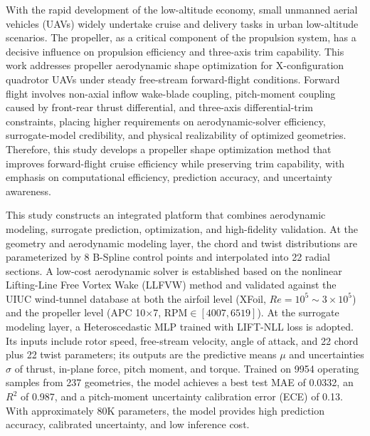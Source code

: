 \begin{eabstract}

With the rapid development of the low-altitude economy, small unmanned aerial vehicles (UAVs) widely undertake cruise and delivery tasks in urban low-altitude scenarios. The propeller, as a critical component of the propulsion system, has a decisive influence on propulsion efficiency and three-axis trim capability. This work addresses propeller aerodynamic shape optimization for X-configuration quadrotor UAVs under steady free-stream forward-flight conditions. Forward flight involves non-axial inflow wake-blade coupling, pitch-moment coupling caused by front-rear thrust differential, and three-axis differential-trim constraints, placing higher requirements on aerodynamic-solver efficiency, surrogate-model credibility, and physical realizability of optimized geometries. Therefore, this study develops a propeller shape optimization method that improves forward-flight cruise efficiency while preserving trim capability, with emphasis on computational efficiency, prediction accuracy, and uncertainty awareness.

This study constructs an integrated platform that combines aerodynamic modeling, surrogate prediction, optimization, and high-fidelity validation. At the geometry and aerodynamic modeling layer, the chord and twist distributions are parameterized by 8 B-Spline control points and interpolated into 22 radial sections. A low-cost aerodynamic solver is established based on the nonlinear Lifting-Line Free Vortex Wake (LLFVW) method and validated against the UIUC wind-tunnel database at both the airfoil level (XFoil, $Re=10^5\sim 3\times 10^5$) and the propeller level (APC 10$\times$7, $\text{RPM}\in[4007,6519]$). At the surrogate modeling layer, a Heteroscedastic MLP trained with LIFT-NLL loss is adopted. Its inputs include rotor speed, free-stream velocity, angle of attack, and 22 chord plus 22 twist parameters; its outputs are the predictive means $\mu$ and uncertainties $\sigma$ of thrust, in-plane force, pitch moment, and torque. Trained on 9954 operating samples from 237 geometries, the model achieves a best test MAE of 0.0332, an $R^2$ of 0.987, and a pitch-moment uncertainty calibration error (ECE) of 0.13. With approximately 80K parameters, the model provides high prediction accuracy, calibrated uncertainty, and low inference cost.


\end{eabstract}
